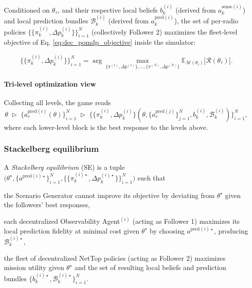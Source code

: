 \documentclass[doc.tex]{subfiles}
\begin{document}
Conditioned on \(\theta_\tau\), and their respective local beliefs $b_k^{(i)}$ (derived from $a_k^{\text{sense}(i)}$) and local prediction bundles $\mathcal{B}_k^{(i)}$ (derived from $a_k^{\text{pred}(i)}$), the set of
per‑radio policies \(\{\{\pi_k^{(i)}, \Delta p_k^{(i)}\}\}_{i=1}^N\) (collectively Follower 2) maximizes the fleet‑level 
objective of Eq. \eqref{eq:dec_pomdp_objective} inside the simulator:

\[
\boxed{
  \{\{\pi_k^{(i)}, \Delta p_k^{(i)}\}\}_{i=1}^N
  =\arg\max_{\{\pi^{(1)}, \Delta p^{(1)}\},\dots,\{\pi^{(N)}, \Delta p^{(N)}\}} 
    \mathbb{E}_{\mathcal{M}(\theta_\tau)}
      \bigl[\mathcal{R}(\theta_\tau)\bigr].
}
\]

\vspace{0.4em}
\paragraph{Tri‑level optimization view}

Collecting all levels, the game reads 
\[
  \theta
  \;\triangleright\;
  \{a_\tau^{\text{pred}(i)}(\theta)\}_{i=1}^N 
  \;\triangleright\;
  \{\{\pi_k^{(i)}, \Delta p_k^{(i)}\}(\theta, \{a_\tau^{\text{pred}(j)}\}_{j=1}^N, b_k^{(i)}, \mathcal{B}_k^{(i)})\}_{i=1}^N, 
\]
where each lower‑level block is the best response to the levels above.

\subsubsection{Stackelberg equilibrium}

A \emph{Stackelberg equilibrium} (SE) is a tuple
\(\bigl(\theta^\star, \{a^{\text{pred}(i)\star}\}_{i=1}^N, \{\{\pi_k^{(i)\star}, \Delta p_k^{(i)\star}\}\}_{i=1}^N \bigr)\) 
such that  

\begin{enumerate*}[label=(\roman*)]
  \item the Scenario Generator cannot improve its objective by deviating
        from \(\theta^\star\) given the followers’ best responses,
  \item each decentralized Observability Agent$^{(i)}$ (acting as Follower 1) maximizes its local prediction fidelity
        at minimal cost given \(\theta^\star\) by choosing \(a^{\text{pred}(i)\star}\), producing \(\mathcal{B}_k^{(i)\star}\),
  \item the fleet of decentralized NetTop policies (acting as Follower 2) maximizes mission utility given
        \(\theta^\star\) and the set of resulting local beliefs and prediction bundles \(\{b_k^{(i)\star}, \mathcal{B}_k^{(i)\star}\}_{i=1}^N\).
\end{enumerate*}
\end{document}
